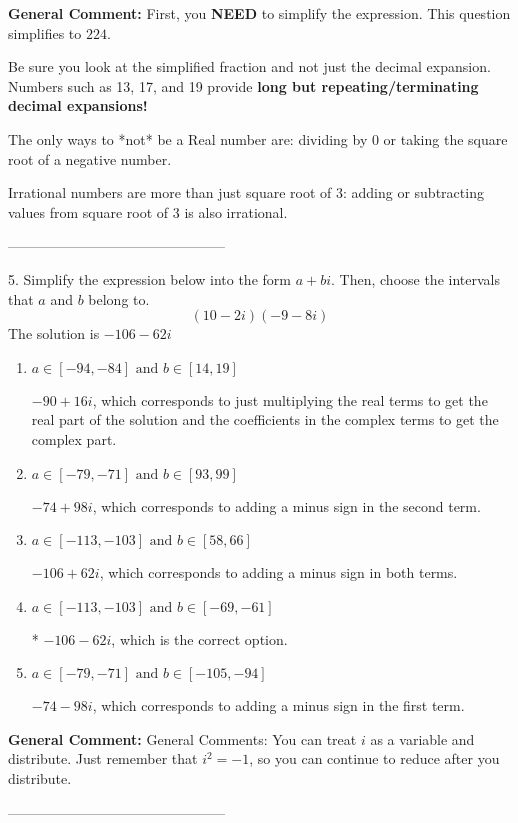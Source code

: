 \documentclass{extbook}[14pt]
\begin{document}
\textbf{General Comment:} First, you \textbf{NEED} to simplify the expression. This question simplifies to $224$. 
 
 Be sure you look at the simplified fraction and not just the decimal expansion. Numbers such as 13, 17, and 19 provide \textbf{long but repeating/terminating decimal expansions!} 
 
 The only ways to *not* be a Real number are: dividing by 0 or taking the square root of a negative number. 
 
 Irrational numbers are more than just square root of 3: adding or subtracting values from square root of 3 is also irrational. 

-----------------------------------------------

5. Simplify the expression below into the form $a+bi$. Then, choose the intervals that $a$ and $b$ belong to.
\[ (10  - 2 i)(-9  - 8 i) \] 
The solution is $ -106  - 62 i $ 

\begin{enumerate}[label=\Alph*.] 
\item $ a \in [-94, -84] \text{ and } b \in [14, 19] $ 

  $-90  + 16 i$, which corresponds to just multiplying the real terms to get the real part of the solution and the coefficients in the complex terms to get the complex part. 
\item $ a \in [-79, -71] \text{ and } b \in [93, 99] $ 

  $-74  + 98 i$, which corresponds to adding a minus sign in the second term. 
\item $ a \in [-113, -103] \text{ and } b \in [58, 66] $ 

  $-106  + 62 i$, which corresponds to adding a minus sign in both terms. 
\item $ a \in [-113, -103] \text{ and } b \in [-69, -61] $ 

 * $-106  - 62 i$, which is the correct option. 
\item $ a \in [-79, -71] \text{ and } b \in [-105, -94] $ 

  $-74  - 98 i$, which corresponds to adding a minus sign in the first term. 
\end{enumerate} 
 
\textbf{General Comment:} General Comments: You can treat $i$ as a variable and distribute. Just remember that $i^2=-1$, so you can continue to reduce after you distribute. 

-----------------------------------------------
\end{document}
